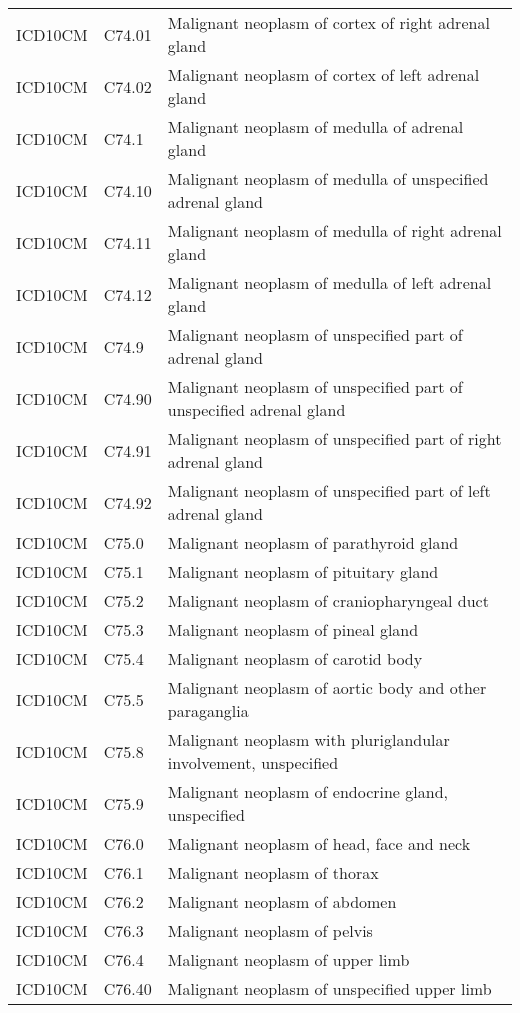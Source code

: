 \begin{longtable}{p{}p{}p{}}
  ICD10CM & C74.01 & Malignant neoplasm of cortex of right adrenal gland \\ 
  ICD10CM & C74.02 & Malignant neoplasm of cortex of left adrenal gland \\ 
  ICD10CM & C74.1 & Malignant neoplasm of medulla of adrenal gland \\ 
  ICD10CM & C74.10 & Malignant neoplasm of medulla of unspecified adrenal gland \\ 
  ICD10CM & C74.11 & Malignant neoplasm of medulla of right adrenal gland \\ 
  ICD10CM & C74.12 & Malignant neoplasm of medulla of left adrenal gland \\ 
  ICD10CM & C74.9 & Malignant neoplasm of unspecified part of adrenal gland \\ 
  ICD10CM & C74.90 & Malignant neoplasm of unspecified part of unspecified adrenal gland \\ 
  ICD10CM & C74.91 & Malignant neoplasm of unspecified part of right adrenal gland \\ 
  ICD10CM & C74.92 & Malignant neoplasm of unspecified part of left adrenal gland \\ 
  ICD10CM & C75.0 & Malignant neoplasm of parathyroid gland \\ 
  ICD10CM & C75.1 & Malignant neoplasm of pituitary gland \\ 
  ICD10CM & C75.2 & Malignant neoplasm of craniopharyngeal duct \\ 
  ICD10CM & C75.3 & Malignant neoplasm of pineal gland \\ 
  ICD10CM & C75.4 & Malignant neoplasm of carotid body \\ 
  ICD10CM & C75.5 & Malignant neoplasm of aortic body and other paraganglia \\ 
  ICD10CM & C75.8 & Malignant neoplasm with pluriglandular involvement, unspecified \\ 
  ICD10CM & C75.9 & Malignant neoplasm of endocrine gland, unspecified \\ 
  ICD10CM & C76.0 & Malignant neoplasm of head, face and neck \\ 
  ICD10CM & C76.1 & Malignant neoplasm of thorax \\ 
  ICD10CM & C76.2 & Malignant neoplasm of abdomen \\ 
  ICD10CM & C76.3 & Malignant neoplasm of pelvis \\ 
  ICD10CM & C76.4 & Malignant neoplasm of upper limb \\ 
  ICD10CM & C76.40 & Malignant neoplasm of unspecified upper limb \\ 

\end{longtable}
